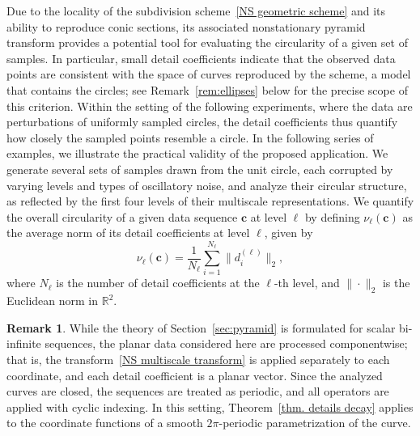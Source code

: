 \documentclass[11pt,a4paper]{article}
\theoremstyle{definition}
\newtheorem{remark}[theorem]{Remark}
\begin{document}
Due to the locality of the subdivision scheme~\eqref{NS geometric scheme} and its ability to reproduce conic sections, its associated nonstationary pyramid transform provides a potential tool for evaluating the circularity of a given set of samples. In particular, small detail coefficients indicate that the observed data points are consistent with the space of curves reproduced by the scheme, a model that contains the circles; see Remark~\ref{rem:ellipses} below for the precise scope of this criterion. Within the setting of the following experiments, where the data are perturbations of uniformly sampled circles, the detail coefficients thus quantify how closely the sampled points resemble a circle. In the following series of examples, we illustrate the practical validity of the proposed application. We generate several sets of samples drawn from the unit circle, each corrupted by varying levels and types of oscillatory noise, and analyze their circular structure, as reflected by the first four levels of their multiscale representations. We quantify the overall circularity of a given data sequence $\boldsymbol{c}$ at level $\ell$ by defining $\nu_\ell(\boldsymbol{c})$ as the average norm of its detail coefficients at level $\ell$, given by
\begin{equation} \label{eqn:nu}
    \nu_\ell(\boldsymbol{c}) = \frac{1}{N_{\ell}}\sum_{i=1}^{N_{\ell}}\big\|d_i^{(\ell)}\big\|_2,
\end{equation}
where $N_{\ell}$ is the number of detail coefficients at the $\ell$-th level, and $\|\cdot\|_2$ is the Euclidean norm in $\mathbb{R}^2$.

\begin{remark} \label{rem:implementation}
While the theory of Section~\ref{sec:pyramid} is formulated for scalar bi-infinite sequences, the planar data considered here are processed componentwise; that is, the transform~\eqref{NS multiscale transform} is applied separately to each coordinate, and each detail coefficient is a planar vector. Since the analyzed curves are closed, the sequences are treated as periodic, and all operators are applied with cyclic indexing. In this setting, Theorem~\ref{thm. details decay} applies to the coordinate functions of a smooth $2\pi$-periodic parametrization of the curve.
\end{remark}
\end{document}
